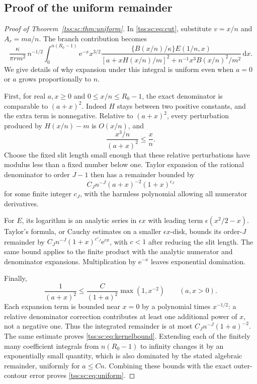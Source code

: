 \documentclass[11pt]{article}
\theoremstyle{remark}\newtheorem{remark}[theorem]{Remark}
\theoremstyle{definition}\newtheorem{definition}[theorem]{Definition}
\newcommand{\dd}{\mathrm d}
\newcommand{\e}{\mathrm e}
\begin{document}
\subsection{Proof of the uniform remainder}
\begin{proof}[Proof of Theorem~\ref{tss:sc:thm:uniform}]
In \eqref{tss:sc:eq:cut}, substitute $v=x/n$ and $A_r=ma/n$. The branch contribution becomes
\[
 \frac{\kappa}{\pi r m^2}\,n^{-1/2}
 \int_0^{n(R_0-1)} \e^{-x}x^{3/2}
 \frac{\{B(x/n)/\kappa\}E(1/n,x)}
 {[a+xH(x/n)/m]^2+n^{-1}x^3B(x/n)^2/m^2}\,\dd x.
\]
We give details of why expansion under this integral is uniform even when $a=0$ or $a$ grows proportionally to $n$.

First, for real $a,x\geq0$ and $0\leq x/n\leq R_0-1$, the exact denominator is comparable to $(a+x)^2$. Indeed $H$ stays between two positive constants, and the extra term is nonnegative. Relative to $(a+x)^2$, every perturbation produced by $H(x/n)-m$ is $O(x/n)$, and
\[
 \frac{x^3/n}{(a+x)^2}\leq\frac{x}{n}.
\]
Choose the fixed slit length small enough that these relative perturbations have modulus less than a fixed number below one. Taylor expansion of the rational denominator to order $J-1$ then has a remainder bounded by
\[
 C_Jn^{-J}(a+x)^{-2}(1+x)^{c_J}
\]
for some finite integer $c_J$, with the harmless polynomial allowing all numerator derivatives.

For $E$, its logarithm is an analytic series in $\epsilon x$ with leading term $\epsilon(x^2/2-x)$. Taylor's formula, or Cauchy estimates on a smaller $\epsilon x$-disk, bounds its order-$J$ remainder by
$C_Jn^{-J}(1+x)^{c'_J}\e^{c x}$, with $c<1$ after reducing the slit length. The same bound applies to the finite product with the analytic numerator and denominator expansions. Multiplication by $\e^{-x}$ leaves exponential domination.

Finally,
\[
 \frac1{(a+x)^2}\leq\frac{C}{(1+a)^2}\max(1,x^{-2})
 \qquad(a,x>0).
\]
Each expansion term is bounded near $x=0$ by a polynomial times $x^{-1/2}$: a relative denominator correction contributes at least one additional power of $x$, not a negative one. Thus the integrated remainder is at most
$C_J n^{-J}(1+a)^{-2}$. The same estimate proves \eqref{tss:sc:eq:kernelbound}. Extending each of the finitely many coefficient integrals from $n(R_0-1)$ to infinity changes it by an exponentially small quantity, which is also dominated by the stated algebraic remainder, uniformly for $a\leq Cn$. Combining these bounds with the exact outer-contour error proves \eqref{tss:sc:eq:uniform}.
\end{proof}
\end{document}
